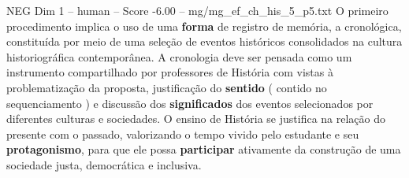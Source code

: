 \begin{textsample}{NEG Dim 1 – human – Score -6.00 – mg/mg\_ef\_ch\_his\_5\_p5.txt}  \label{ex:f1_neg_016}
O primeiro procedimento implica o uso de uma \textbf{forma} de registro de memória, a cronológica, constituída por meio de uma seleção de eventos históricos consolidados na cultura historiográfica contemporânea.
A cronologia deve ser pensada como um instrumento compartilhado por professores de História com vistas à problematização da proposta, justificação do \textbf{sentido} ( contido no sequenciamento ) e discussão dos \textbf{significados} dos eventos selecionados por diferentes culturas e sociedades.
O ensino de História se justifica na relação do presente com o passado, valorizando o tempo vivido pelo estudante e seu \textbf{protagonismo}, para que ele possa \textbf{participar} ativamente da construção de uma sociedade justa, democrática e inclusiva.

\end{textsample}
